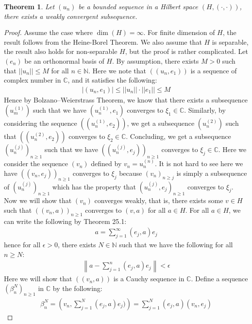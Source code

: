 \documentclass[11pt]{book}
\theoremstyle{break}
\theoremstyle{break}
\newtheorem{thm}{Theorem}[section]
\newcommand{\N}{\mathbb{N}}
\newcommand{\C}{\mathbb{C}}
\begin{document}
\begin{thm}
Let $(u_n)$ be a bounded sequence in a Hilbert space $(H,(\cdot,\cdot))$, there exists a weakly convergent subsequence. 
\end{thm}
\begin{proof}
Assume the case where $\dim(H) = \infty$. For finite dimension of $H$, the result follows from the Heine-Borel Theorem. We also assume that $H$ is separable, the result also holds for non-separable $H$, but the proof is rather complicated. Let $(e_n)$ be an orthonormal basis of $H$. By assumption, there exists $M>0$ such that $||u_n|| \leq M$ for all $n\in \N$. Here we note that $((u_n, e_1))$ is a sequence of complex number in $\C$, and it satisfies the following:
\begin{align*}
|(u_n, e_1)| \leq ||u_n ||\cdot ||e_1|| \leq M
\end{align*}
Hence by Bolzano–Weierstrass Theorem, we know that there exists a subsequence $(u_m^{(1)})$ such that we have $(u_n^{(1)}, e_1)$ converges to $\xi_1 \in \C$. Similarly, by considering the sequence $((u_n^{(1)}, e_2))$, we get a subsequence $(u_n^{(2)})$ such that $((u_n^{(2)},e_2))$ converges to $\xi_2\in \C$. Concluding, we get a subsequence $(u_n^{(j)})_{n\geq 1 }$ such that we have $((u_n^{(j)},e_j))_{n\geq 1}$ converges to $\xi_j\in \C$. Here we consider the sequence $(v_n)$ defined by $v_n = u_n^{(n)}$. It is not hard to see here we have $((v_n, e_j))_{n\geq 1}$ converges to $\xi_j$ because $(v_n)_{n\geq j}$ is simply a subsequence of $(u_n^{(j)})_{n\geq 1}$ which has the property that $(u_n^{(j)}, e_j)_{n \geq 1}$ converges to $\xi_j$. Now we will show that $(v_n)$ converges weakly, that is, there exists some $v \in H$ such that $((v_n,a))_{n\geq 1}$ converges to $(v,a)$ for all $a \in H$. For all $a \in H$, we can write the following by Theorem 25.1:
\begin{align*}
a = \sum_{j=1}^\infty (e_j, a) e_j
\end{align*}
hence for all $\epsilon>0$, there exists $N \in \N$ such that we have the following for all $n \geq N$:
\begin{align*}
\left\| a - \sum_{j=1}^n (e_j,a)e_j \right\| < \epsilon
\end{align*}
Here we will show that $((v_n,a))$ is a Cauchy sequence in $\C$. Define a sequence $(\beta^N_n)_{n\geq 1}$ in $\C$ by the following:
\begin{align*}
\beta_n^N = \left( v_n, \sum_{j=1}^N (e_j, a) e_j) \right) = \sum_{j=1}^N (e_j, a) (v_n, e_j)
\end{align*}

\end{proof}
\end{document}
